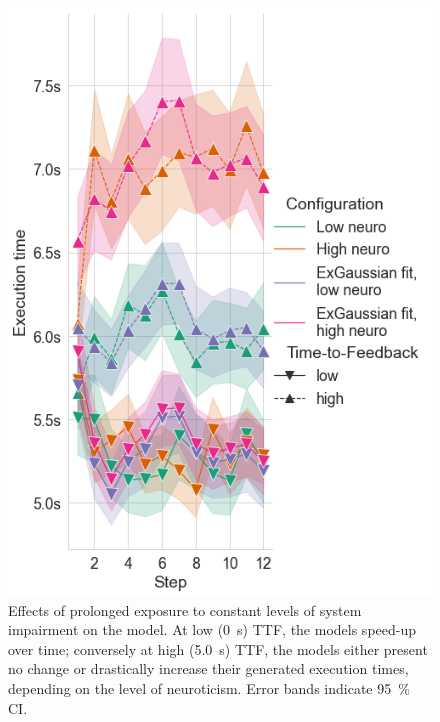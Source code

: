 \begin{figure}
    \centering
    \includegraphics[width=.8\columnwidth]{figs/new_model/exectime_over_steps}
    \caption{%
    Effects of prolonged exposure to constant levels of system impairment on the model.
    At low (\SI{0}{\second}) \gls{TTF}, the models speed-up over time; conversely at high (\SI{5.0}{\second}) \gls{TTF}, the models either present no change or drastically increase their generated execution times, depending on the level of neuroticism.
    Error bands indicate \SI{95}{\percent} \gls{CI}.
    }\label{fig:exectimeduration}
\end{figure}

